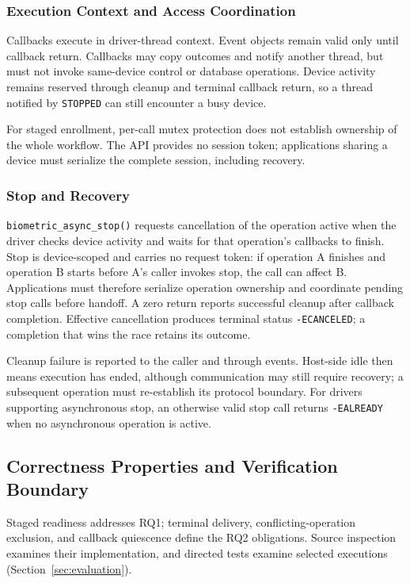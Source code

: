 \subsubsection{Execution Context and Access Coordination}

Callbacks execute in driver-thread context. Event objects remain valid only until callback return. Callbacks may copy outcomes and notify another thread, but must not invoke same-device control or database operations. Device activity remains reserved through cleanup and terminal callback return, so a thread notified by \texttt{STOPPED} can still encounter a busy device.

For staged enrollment, per-call mutex protection does not establish ownership of the whole workflow. The API provides no session token; applications sharing a device must serialize the complete session, including recovery.

\subsubsection{Stop and Recovery}

\texttt{biometric\_\allowbreak{}async\_\allowbreak{}stop()} requests cancellation of the operation active when the driver checks device activity and waits for that operation's callbacks to finish. Stop is device-scoped and carries no request token: if operation A finishes and operation B starts before A's caller invokes stop, the call can affect B. Applications must therefore serialize operation ownership and coordinate pending stop calls before handoff. A zero return reports successful cleanup after callback completion. Effective cancellation produces terminal status \texttt{-ECANCELED}; a completion that wins the race retains its outcome.

Cleanup failure is reported to the caller and through events. Host-side idle then means execution has ended, although communication may still require recovery; a subsequent operation must re-establish its protocol boundary. For drivers supporting asynchronous stop, an otherwise valid stop call returns \texttt{-EALREADY} when no asynchronous operation is active.

\subsection{Correctness Properties and Verification Boundary}
\label{sec:correctness_properties}

Staged readiness addresses RQ1; terminal delivery, conflicting-operation exclusion, and callback quiescence define the RQ2 obligations. Source inspection examines their implementation, and directed tests examine selected executions (Section~\ref{sec:evaluation}).

